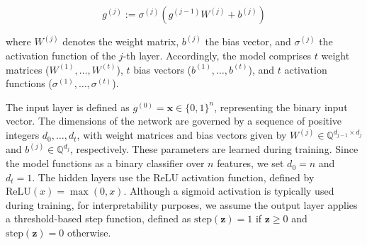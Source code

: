 \documentclass{article}
\newcommand{\z}{\textbf{z}}
\newcommand{\x}{\textbf{x}}
\begin{document}
\begin{equation}
g^{(j)} := \sigma^{(j)}(g^{(j-1)} W^{(j)} + b^{(j)})
\end{equation}  

where $W^{(j)}$ denotes the weight matrix, $b^{(j)}$ the bias vector, and $\sigma^{(j)}$ the activation function of the $j$-th layer. Accordingly, the model comprises $t$ weight matrices ($W^{(1)}, \ldots, W^{(t)}$), $t$ bias vectors ($b^{(1)}, \ldots, b^{(t)}$), and $t$ activation functions ($\sigma^{(1)}, \ldots, \sigma^{(t)}$).






The input layer is defined as $g^{(0)} = \x \in \{0,1\}^n$, representing the binary input vector. The dimensions of the network are governed by a sequence of positive integers ${d_0, \ldots, d_t}$, with weight matrices and bias vectors given by $W^{(j)} \in \mathbb{Q}^{d_{j-1} \times d_j}$ and $b^{(j)} \in \mathbb{Q}^{d_j}$, respectively. These parameters are learned during training. Since the model functions as a binary classifier over $n$ features, we set $d_0 = n$ and $d_t = 1$. The hidden layers use the ReLU activation function, defined by $\text{ReLU}(x) = \max(0, x)$. Although a sigmoid activation is typically used during training, for interpretability purposes, we assume the output layer applies a threshold-based step function, defined as $\text{step}(\z) = 1$ if $\z \geq 0$ and $\text{step}(\z) = 0$ otherwise.
\end{document}
